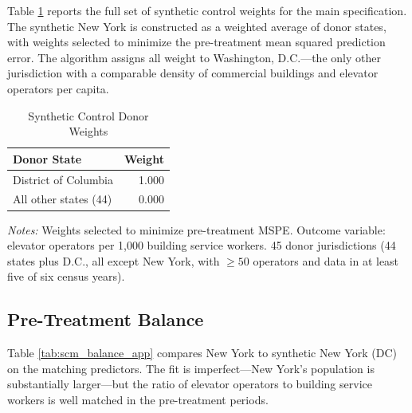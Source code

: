 \documentclass[12pt]{article}
\begin{document}
Table \ref{tab:scm_weights_app} reports the full set of synthetic control weights for the main specification. The synthetic New York is constructed as a weighted average of donor states, with weights selected to minimize the pre-treatment mean squared prediction error. The algorithm assigns all weight to Washington, D.C.---the only other jurisdiction with a comparable density of commercial buildings and elevator operators per capita.

\begin{table}[H]
\centering
\caption{Synthetic Control Donor Weights}
\label{tab:scm_weights_app}
\begin{threeparttable}
\begin{tabular}{lr}
\toprule
Donor State & Weight \\
\midrule
District of Columbia & 1.000 \\
All other states (44) & 0.000 \\
\bottomrule
\end{tabular}
\begin{tablenotes}[flushleft]
\small
\item \textit{Notes:} Weights selected to minimize pre-treatment MSPE. Outcome variable: elevator operators per 1,000 building service workers. 45 donor jurisdictions (44 states plus D.C., all except New York, with $\geq 50$ operators and data in at least five of six census years).
\end{tablenotes}
\end{threeparttable}
\end{table}

\subsection{Pre-Treatment Balance}

Table \ref{tab:scm_balance_app} compares New York to synthetic New York (DC) on the matching predictors. The fit is imperfect---New York's population is substantially larger---but the ratio of elevator operators to building service workers is well matched in the pre-treatment periods.
\end{document}
